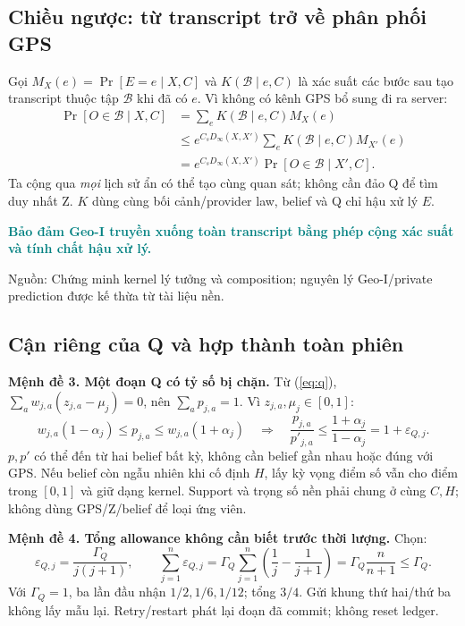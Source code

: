 \documentclass[10pt,a4paper]{article}
\newcommand{\key}[1]{\par\smallskip\noindent\textcolor{teal}{\textbf{#1}}\par\smallskip}
\newcommand{\source}[1]{\par{\footnotesize\color{gray}Nguồn: #1}\par}
\begin{document}
\subsection{Chiều ngược: từ transcript trở về phân phối GPS}
Gọi $M_X(e)=\Pr[E=e\mid X,C]$ và $K(\mathcal B\mid e,C)$ là xác suất các bước sau tạo transcript
thuộc tập $\mathcal B$ khi đã có $e$. Vì không có kênh GPS bổ sung đi ra server:
\begin{equation}
\begin{aligned}
\Pr[O\in\mathcal B\mid X,C]
&=\sum_e K(\mathcal B\mid e,C)M_X(e)\\
&\le e^{C_sD_\infty(X,X')}\sum_e K(\mathcal B\mid e,C)M_{X'}(e)\\
&=e^{C_sD_\infty(X,X')}\Pr[O\in\mathcal B\mid X',C].
\end{aligned}
\label{eq:postprocessing}
\end{equation}
Ta cộng qua \emph{mọi} lịch sử ẩn có thể tạo cùng quan sát; không cần đảo Q để tìm duy nhất Z.
$K$ dùng cùng bối cảnh/provider law, belief và Q chỉ hậu xử lý $E$.
\key{Bảo đảm Geo-I truyền xuống toàn transcript bằng phép cộng xác suất và tính chất hậu xử lý.}
\source{Chứng minh kernel lý tưởng và composition; nguyên lý Geo-I/private prediction được kế thừa từ tài liệu nền.}

\clearpage
\subsection{Cận riêng của Q và hợp thành toàn phiên}
\textbf{Mệnh đề 3. Một đoạn Q có tỷ số bị chặn.} Từ (\ref{eq:q}), $\sum_aw_{j,a}(z_{j,a}-\mu_j)=0$,
nên $\sum_ap_{j,a}=1$. Vì $z_{j,a},\mu_j\in[0,1]$:
\begin{equation}
w_{j,a}(1-\alpha_j)\le p_{j,a}\le w_{j,a}(1+\alpha_j)
\quad\Longrightarrow\quad
\boxed{\frac{p_{j,a}}{p'_{j,a}}\le\frac{1+\alpha_j}{1-\alpha_j}=1+\varepsilon_{Q,j}.}
\label{eq:qbound}
\end{equation}
$p,p'$ có thể đến từ hai belief bất kỳ, không cần belief gần nhau hoặc đúng với GPS.
Nếu belief còn ngẫu nhiên khi cố định $H$, lấy kỳ vọng điểm số vẫn cho điểm trong $[0,1]$ và giữ dạng kernel.
Support và trọng số nền phải chung ở cùng $C,H$; không dùng GPS/Z/belief để loại ứng viên.

\textbf{Mệnh đề 4. Tổng allowance không cần biết trước thời lượng.} Chọn:
\begin{equation}
\varepsilon_{Q,j}=\frac{\Gamma_Q}{j(j+1)},\qquad
\sum_{j=1}^{n}\varepsilon_{Q,j}
=\Gamma_Q\sum_{j=1}^{n}\left(\frac1j-\frac1{j+1}\right)
=\Gamma_Q\frac{n}{n+1}\le\Gamma_Q.
\label{eq:allowance}
\end{equation}
Với $\Gamma_Q=1$, ba lần đầu nhận $1/2,1/6,1/12$; tổng $3/4$.
Gửi khung thứ hai/thứ ba không lấy mẫu lại. Retry/restart phát lại đoạn đã commit; không reset ledger.
\end{document}
